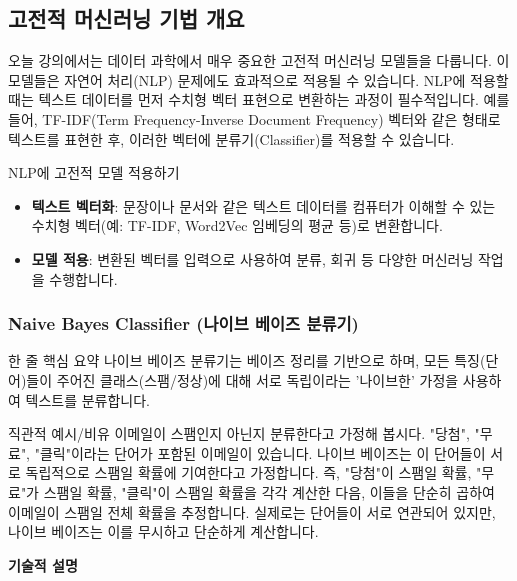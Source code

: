 \documentclass[11pt,a4paper]{article}
\begin{document}
\newpage
\subsection{고전적 머신러닝 기법 개요}

오늘 강의에서는 데이터 과학에서 매우 중요한 고전적 머신러닝 모델들을 다룹니다. 이 모델들은 자연어 처리(NLP) 문제에도 효과적으로 적용될 수 있습니다. NLP에 적용할 때는 텍스트 데이터를 먼저 수치형 벡터 표현으로 변환하는 과정이 필수적입니다. 예를 들어, TF-IDF(Term Frequency-Inverse Document Frequency) 벡터와 같은 형태로 텍스트를 표현한 후, 이러한 벡터에 분류기(Classifier)를 적용할 수 있습니다.

\begin{infobox}{NLP에 고전적 모델 적용하기}
\begin{itemize}
    \item \textbf{텍스트 벡터화}: 문장이나 문서와 같은 텍스트 데이터를 컴퓨터가 이해할 수 있는 수치형 벡터(예: TF-IDF, Word2Vec 임베딩의 평균 등)로 변환합니다.
    \item \textbf{모델 적용}: 변환된 벡터를 입력으로 사용하여 분류, 회귀 등 다양한 머신러닝 작업을 수행합니다.
\end{itemize}
\end{infobox}

\subsubsection{Naive Bayes Classifier (나이브 베이즈 분류기)}

\begin{summarybox}{한 줄 핵심 요약}
나이브 베이즈 분류기는 베이즈 정리를 기반으로 하며, 모든 특징(단어)들이 주어진 클래스(스팸/정상)에 대해 서로 독립이라는 '나이브한' 가정을 사용하여 텍스트를 분류합니다.
\end{summarybox}

\begin{examplebox}{직관적 예시/비유}
이메일이 스팸인지 아닌지 분류한다고 가정해 봅시다. "당첨", "무료", "클릭"이라는 단어가 포함된 이메일이 있습니다. 나이브 베이즈는 이 단어들이 서로 독립적으로 스팸일 확률에 기여한다고 가정합니다. 즉, "당첨"이 스팸일 확률, "무료"가 스팸일 확률, "클릭"이 스팸일 확률을 각각 계산한 다음, 이들을 단순히 곱하여 이메일이 스팸일 전체 확률을 추정합니다. 실제로는 단어들이 서로 연관되어 있지만, 나이브 베이즈는 이를 무시하고 단순하게 계산합니다.
\end{examplebox}

\textbf{기술적 설명}
\end{document}
